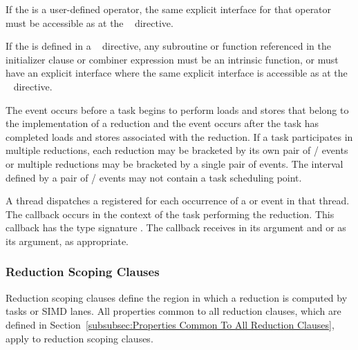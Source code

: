 \begin{itemize}
\begin{fortranspecific}
\item If the  is a user-defined operator, the same
explicit interface for that operator must be accessible as at the
~ directive.

\item If the  is defined in a ~
directive, any subroutine or function referenced in the initializer clause or
combiner expression must be an intrinsic function, or must have an explicit
interface where the same explicit interface is accessible as at the
~ directive.
\end{fortranspecific}
\end{itemize}

\events

The  event occurs before a task 
begins to perform loads and stores that belong to the implementation of a reduction
and the  event occurs after the task 
has completed loads and stores associated with the reduction.
If a task participates in multiple reductions, each reduction may be bracketed by its own pair of 
/ events or multiple reductions may be bracketed by a single pair of events.
The interval defined by a pair of / events may not contain a task scheduling point.


\tools

A thread dispatches a registered 
for each occurrence of a  or  
event in that thread.  The callback occurs in the context of the task performing the reduction.
This callback has the type signature .  
The callback receives  in its  argument and
 or  as its
 argument, as appropriate.


\subsubsection{Reduction Scoping Clauses}
\label{subsubsec:Reduction Scoping Clauses}
Reduction scoping clauses define the region in which a reduction is computed by
tasks or SIMD lanes. All properties common to all reduction clauses,
which are defined in Section~\ref{subsubsec:Properties Common To All Reduction
Clauses}, apply to reduction scoping clauses.

